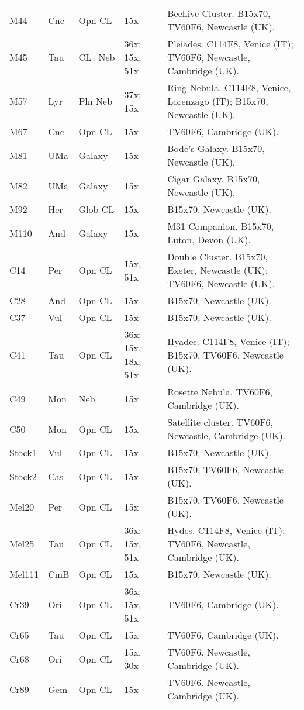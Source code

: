 \begin{longtable}{ p{0.7in}  p{0.3in}  p{0.6in}  p{0.9in}  p{5.8in} }
M44 & Cnc & Opn CL & 15x & Beehive Cluster. B15x70, TV60F6, Newcastle (UK). \\ 
M45 & Tau & CL+Neb & 36x; 15x, 51x & Pleiades. C114F8, Venice (IT); TV60F6, Newcastle, Cambridge (UK). \\ 
M57 & Lyr & Pln Neb & 37x; 15x & Ring Nebula. C114F8, Venice, Lorenzago (IT); B15x70, Newcastle (UK). \\ 
M67 & Cnc & Opn CL & 15x & TV60F6, Cambridge (UK). \\ 
M81 & UMa & Galaxy & 15x & Bode's Galaxy. B15x70, Newcastle (UK). \\ 
M82 & UMa & Galaxy & 15x & Cigar Galaxy. B15x70, Newcastle (UK). \\ 
M92 & Her & Glob CL & 15x & B15x70, Newcastle (UK). \\ 
M110 & And & Galaxy & 15x & M31 Companion. B15x70, Luton, Devon (UK). \\ 
C14 & Per & Opn CL & 15x, 51x & Double Cluster. B15x70, Exeter, Newcastle (UK); TV60F6, Newcastle (UK). \\ 
C28 & And & Opn CL & 15x & B15x70, Newcastle (UK). \\ 
C37 & Vul & Opn CL & 15x & B15x70, Newcastle (UK). \\ 
C41 & Tau & Opn CL & 36x; 15x, 18x, 51x & Hyades. C114F8, Venice (IT); B15x70, TV60F6, Newcastle (UK). \\ 
C49 & Mon & Neb & 15x & Rosette Nebula. TV60F6, Cambridge (UK). \\ 
C50 & Mon & Opn CL & 15x & Satellite cluster. TV60F6, Newcastle, Cambridge (UK). \\ 
Stock1 & Vul & Opn CL & 15x & B15x70, Newcastle (UK). \\ 
Stock2 & Cas & Opn CL & 15x & B15x70, TV60F6, Newcastle (UK). \\ 
Mel20 & Per & Opn CL & 15x & B15x70, TV60F6, Newcastle (UK). \\ 
Mel25 & Tau & Opn CL & 36x; 15x, 51x & Hydes. C114F8, Venice (IT); TV60F6, Newcastle, Cambridge (UK). \\ 
Mel111 & CmB & Opn CL & 15x & B15x70, Newcastle (UK). \\ 
Cr39 & Ori & Opn CL & 36x; 15x, 51x & TV60F6, Cambridge (UK). \\ 
Cr65 & Tau & Opn CL & 15x & TV60F6, Cambridge (UK). \\ 
Cr68 & Ori & Opn CL & 15x, 30x & TV60F6. Newcastle, Cambridge (UK). \\ 
Cr89 & Gem & Opn CL & 15x & TV60F6. Newcastle, Cambridge (UK). \\ 

\end{longtable}
